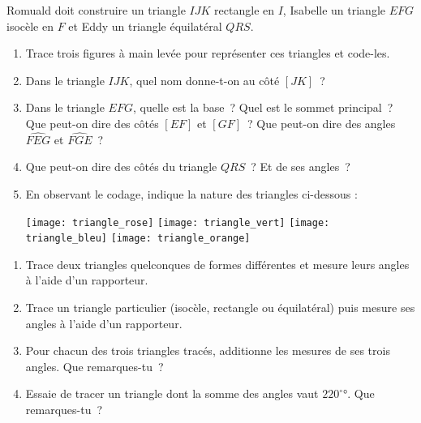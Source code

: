 \begin{activite}

Romuald doit construire un triangle $IJK$ rectangle en $I$, Isabelle un triangle $EFG$ isocèle en $F$ et Eddy un triangle équilatéral $QRS$.

\begin{enumerate}

\item Trace trois figures à main levée pour représenter ces triangles et code-les.

\vspace{4cm}
\item Dans le triangle $IJK$, quel nom donne-t-on au côté $[JK]$ ? \dotfill

\item Dans le triangle $EFG$, quelle est la base ? Quel est le sommet principal ? Que peut-on dire des côtés $[EF]$ et $[GF]$ ? Que peut-on dire des angles $\widehat{FEG}$ et $\widehat{FGE}$ ?  \dotfill

 \dotfill

\item Que peut-on dire des côtés du triangle $QRS$ ? Et de ses angles ?  \dotfill

\item En observant le codage, indique la nature des triangles ci-dessous :

\texttt{[image: triangle\_rose]} \hfill \texttt{[image: triangle\_vert]} \hfill \texttt{[image: triangle\_bleu]} \hfill \texttt{[image: triangle\_orange]}

\end{enumerate}

\end{activite}


\begin{activite}

\begin{enumerate}
\item Trace deux triangles quelconques de formes différentes et mesure leurs angles à l'aide d'un rapporteur.

\item Trace un triangle particulier (isocèle, rectangle ou équilatéral) puis mesure ses angles à l'aide d'un rapporteur.

\item Pour chacun des trois triangles tracés, additionne les mesures de ses trois angles. Que remarques-tu ?

\item Essaie de tracer un triangle dont la somme des angles vaut $220^\circ°$. Que remarques-tu ?
\end{enumerate}

\end{activite}

